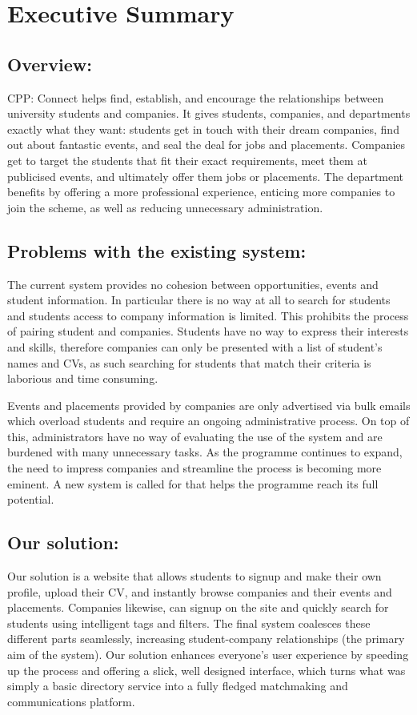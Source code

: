 \section{Executive Summary}

\subsection{Overview:}
CPP: Connect helps find, establish, and encourage the relationships between university students and companies. It gives students, companies, and departments exactly what they want: students get in touch with their dream companies, find out about fantastic events, and seal the deal for jobs and placements. Companies get to target the students that fit their exact requirements, meet them at publicised events, and ultimately offer them jobs or placements. The department benefits by offering a more professional experience, enticing more companies to join the scheme, as well as reducing unnecessary administration.

\subsection{Problems with the existing system:}
The current system provides no cohesion between opportunities, events and student information. In particular there is no way at all to search for students and students access to company information is limited. This prohibits the process of pairing student and companies. 
Students have no way to express their interests and skills, therefore companies can only be presented with a list of student's names and CVs, as such searching for students that match their criteria is laborious and time consuming.

Events and placements provided by companies are only advertised via bulk emails which overload students and require an ongoing administrative process. On top of this, administrators have no way of evaluating the use of the system and are burdened with many unnecessary tasks.    
As the programme continues to expand, the need to impress companies and streamline the process is becoming more eminent. A new system is called for that helps the programme reach its full potential.

\subsection{Our solution:}
Our solution is a website that allows students to signup and make their own profile, upload their CV, and instantly browse companies and their events and placements. Companies likewise, can signup on the site and quickly search for students using intelligent tags and filters. The final system coalesces these different parts seamlessly, increasing student-company relationships (the primary aim of the system). Our solution enhances everyone's user experience by speeding up the process and offering a slick, well designed interface, which turns what was simply a basic directory service into a fully fledged matchmaking and communications platform.
